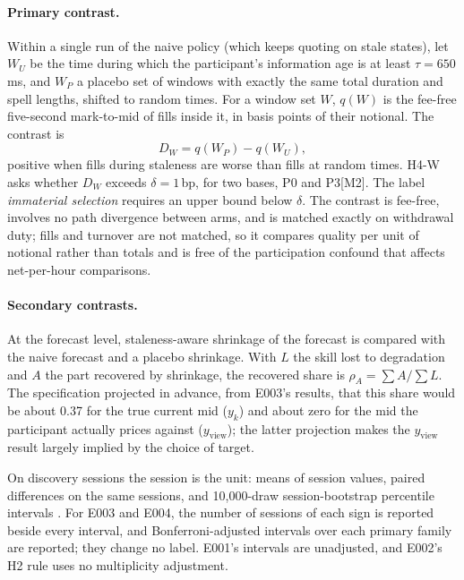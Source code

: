 \documentclass[11pt]{article}
\makeatletter
\newcommand{\bp}{\,bp}
\renewcommand\subsection{\@startsection{subsection}{2}{\z@}{-3ex\@plus -1ex \@minus -.2ex}{1ex \@plus .2ex}{\normalfont\normalsize\bfseries}}
\makeatother
\begin{document}
\paragraph{Primary contrast.} Within a single run of the naive policy (which keeps quoting on stale states), let
$W_U$ be the time during which the participant's information age is at least $\tau=650$\,ms, and $W_P$ a placebo set of
windows with exactly the same total duration and spell lengths, shifted to random times. For a window set $W$,
$q(W)$ is the fee-free five-second mark-to-mid of fills inside it, in basis points of their notional. The contrast is
\begin{equation}
  D_W = q(W_P) - q(W_U),
\end{equation}
positive when fills during staleness are worse than fills at random times. H4-W asks whether $D_W$ exceeds $\delta=1$\bp,
for two bases, P0 and P3[M2]. The label \emph{immaterial selection} requires an upper bound below $\delta$. The contrast is
fee-free, involves no path divergence between arms, and is matched exactly on withdrawal duty; fills and turnover are not
matched, so it compares quality per unit of notional rather than totals and is free of the participation confound that
affects net-per-hour comparisons.

\paragraph{Secondary contrasts.} At the forecast level, staleness-aware shrinkage of the forecast is compared with the
naive forecast and a placebo shrinkage. With $L$ the skill lost to degradation and $A$ the part recovered by shrinkage,
the recovered share is $\rho_A=\sum A/\sum L$. The specification projected in advance, from E003's results, that this
share would be about 0.37 for the true current mid ($y_k$) and about zero for the mid the participant actually prices
against ($y_\mathrm{view}$); the latter projection makes the $y_\mathrm{view}$ result largely implied by the choice of
target.

\subsection{Inference and the held-out labels}\label{sec:inference}

On discovery sessions the session is the unit: means of session values, paired differences on the same sessions, and
10{,}000-draw session-bootstrap percentile intervals \citep{efron1993}. For E003 and E004, the number of sessions of each
sign is reported beside every interval, and Bonferroni-adjusted intervals over each primary family are reported; they
change no label. E001's intervals are unadjusted, and E002's H2 rule uses no multiplicity adjustment.
\end{document}
